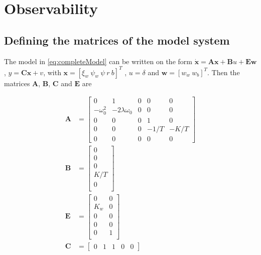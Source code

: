 
\section{Observability}

\subsection{Defining the matrices of the model system} \label{subsec:4a}

The model in \cref{eq:completeModel} can be written on the form $\mathbf{\dot x} = \mathbf{A} \mathbf{x} + \mathbf{B}u + \mathbf{E}\mathbf{w}$, $ y = \mathbf{C}\mathbf{x} + v$, with $\mathbf{x} = [ \xi_w\ \psi_w\ \psi\ r\ b]^ T $ , $ u = \delta $ and $ \mathbf{w} = [w_w\ w_b]^T$. Then the matrices $\mathbf{A}$, $\mathbf{B}$, $\mathbf{C}$ and $\mathbf{E}$ are

\begin{subequations}
    \begin{align}
        \mathbf{A} &= \begin{bmatrix}
        0 & 1 & 0 & 0 & 0 \\
        -\omega_0^2 & -2\lambda\omega_0 & 0 & 0 & 0 \\
        0 & 0 & 0 & 1 & 0 \\
        0 & 0 & 0 & -1/T & -K/T \\
        0 & 0 & 0 & 0 & 0
        \end{bmatrix} \\
        \mathbf{B} &= \begin{bmatrix}
        0 \\
        0 \\
        0 \\
        K/T \\
        0 \\
        \end{bmatrix} \\
        \mathbf{E} &= \begin{bmatrix}
        0 & 0 \\
        K_w & 0 \\
        0 & 0 \\
        0 & 0 \\
        0 & 1 \\
        \end{bmatrix} \\
        \mathbf{C} &= \begin{bmatrix}
        0 & 1 & 1 & 0 & 0
        \end{bmatrix}
    \end{align}
\end{subequations}

